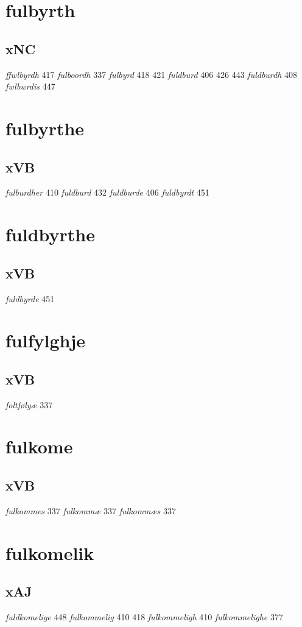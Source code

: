 \documentclass[a4paper,twocolumn]{article}
\begin{document}
\section{fulbyrth}
\label{sec:orgf5050be}
\subsection{xNC}
\label{sec:org737f63c}
\emph{ffwlbyrdh} 417 \emph{fulboordh} 337 \emph{fulbyrd} 418 421 \emph{fuldburd} 406 426 443 \emph{fuldburdh} 408 \emph{fwlbwrdis} 447 
\section{fulbyrthe}
\label{sec:org737a1e1}
\subsection{xVB}
\label{sec:org8957028}
\emph{fulburdher} 410 \emph{fuldburd} 432 \emph{fuldburde} 406 \emph{fuldbyrdt} 451 
\section{fuldbyrthe}
\label{sec:org7a7317b}
\subsection{xVB}
\label{sec:org9aed5e0}
\emph{fuldbyrde} 451 
\section{fulfylghje}
\label{sec:org96c2ad6}
\subsection{xVB}
\label{sec:org2e3a45e}
\emph{foltfølyæ} 337 
\section{fulkome}
\label{sec:orgc6ce323}
\subsection{xVB}
\label{sec:orgb27ec8f}
\emph{fulkommes} 337 \emph{fulkommæ} 337 \emph{fulkommæs} 337 
\section{fulkomelik}
\label{sec:org86f0539}
\subsection{xAJ}
\label{sec:org8f3b97a}
\emph{fuldkomelige} 448 \emph{fulkommelig} 410 418 \emph{fulkommeligh} 410 \emph{fulkommelighe} 377 
\end{document}
